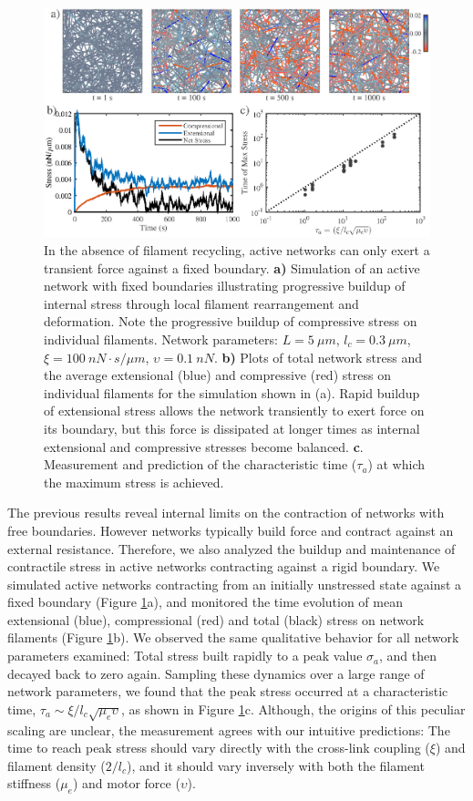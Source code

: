 \documentclass[10pt,letterpaper]{article}
\begin{document}
\begin{figure}[h!]
	\centering
	\includegraphics[width=\hsize]{figures/figure4b}
	\caption{\label{fig:active_str} In the absence of filament recycling, active networks can only exert a transient force against a fixed boundary.  \textbf{a)} Simulation of an active network with fixed boundaries illustrating progressive buildup of internal stress through local filament rearrangement and deformation. Note the progressive buildup of compressive stress on individual filaments. Network parameters: $L=5\: \mu m$, $l_c=0.3\: \mu m$, $\xi=100\: nN\cdot s/\mu m$, $\upsilon=0.1\: nN$.  \textbf{b)} Plots of total network stress and the average extensional (blue) and compressive (red) stress on individual filaments for the simulation shown in (a). Rapid buildup of extensional stress allows the network transiently to exert force on its boundary, but this force is dissipated at longer times as internal extensional and compressive stresses become balanced. \textbf{c}. Measurement and prediction of the characteristic time ($\tau_a$) at which the maximum stress is achieved. }
\end{figure}

The previous results reveal internal limits on the contraction of networks with free boundaries.  However networks typically build force and contract against an external resistance.  Therefore, we also analyzed the buildup and maintenance of contractile stress in active networks contracting against a rigid boundary. We simulated active networks contracting from an initially unstressed state against a fixed boundary (Figure \ref{fig:active_str}a), and  monitored the time evolution of mean extensional (blue), compressional (red) and total (black) stress on network filaments (Figure \ref{fig:active_str}b). We observed the same qualitative behavior for all network parameters examined: Total stress built rapidly to a peak value $\sigma_a$, and then decayed back to zero again.  Sampling these dynamics over a large range of network parameters, we found that the peak stress occurred at a characteristic time, $\tau_a\sim\xi/l_c\sqrt{\mu_e\upsilon}$, as shown in Figure \ref{fig:active_str}c. Although, the origins of this peculiar scaling are unclear, the measurement agrees with our intuitive predictions: The time to reach peak stress should vary directly with the cross-link coupling ($\xi$) and filament density ($2/l_c$), and it should vary inversely with both the filament stiffness ($\mu_e$) and motor force ($\upsilon$).  
\end{document}
